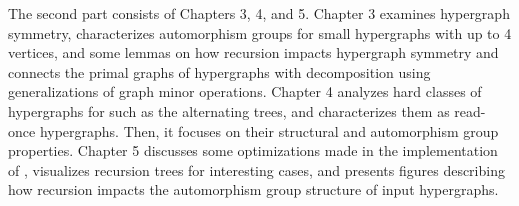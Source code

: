 The second part consists of Chapters 3, 4, and 5. Chapter 3 examines hypergraph symmetry, characterizes automorphism groups for small hypergraphs with up to 4 vertices, and some lemmas on how \FKA{} recursion impacts hypergraph symmetry and connects the primal graphs of hypergraphs with \FKA{} decomposition using generalizations of graph minor operations. Chapter 4 analyzes hard classes of hypergraphs for \FKA{} such as the alternating trees, and characterizes them as read-once hypergraphs. Then, it focuses on their structural and automorphism group properties. Chapter 5 discusses some optimizations made in the implementation of \FKA, visualizes recursion trees for interesting cases, and presents figures describing how recursion impacts the automorphism group structure of input hypergraphs.
